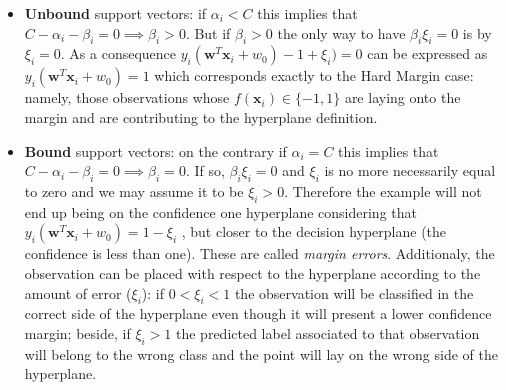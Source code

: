 \begin{itemize}
	\item \textbf{Unbound} support vectors: if $\alpha_i < C$ this implies that $C - \alpha_{i}- \beta_{i}= 0 \implies \beta_{i}> 0$.
 		But if  $\beta_i > 0$ the only way to have $\beta_{i}\xi_{i}= 0$ is by $\xi_i =0$. As a consequence 
   		$y_{i}(\pmb{w}^{T}\pmb{x}_{i}+ w_{0}) - 1 + \xi_{i}) = 0$ can be expressed as $y_{i}(\pmb{w}^{T}\pmb{x}_{i}+ w_{0}) = 1$ 
     		which corresponds exactly to the Hard Margin case: namely, those observations whose $f(\pmb{x}_{i}) \in \{-1, 1\}$ are
       		laying onto the margin and are contributing to the hyperplane definition.
 	\item \textbf{Bound} support vectors: on the contrary if $\alpha_i = C$ this implies that $C - \alpha_{i}- \beta_{i}= 0 \implies \beta_{i} = 0$.
		If so, $\beta_{i}\xi_{i}= 0$ and $\xi_{i}$ is no more necessarily equal to zero and we may assume it to be $\xi_{i} > 0$.
  		Therefore the example will not end up being on the confidence one hyperplane considering that $y_{i}(\pmb{w}^{T}\pmb{x}_{i}+ w_{0}) = 1 - \xi_{i}$ ,
    		but closer to the decision hyperplane (the confidence is less than one). These are called \textit{margin errors}.
      		Additionaly, the observation can be placed with respect to the hyperplane according
      		to the amount of error ($\xi_{i}$): if $ 0 < \xi_{i} < 1$ the observation will be classified 
		in the correct side of the hyperplane even though it will present a lower confidence margin; 
  		beside, if $\xi_{i} > 1$ the predicted label associated to that observation will belong to the wrong class and
    		the point will lay on the wrong side of the hyperplane. 
      		
\end{itemize}



